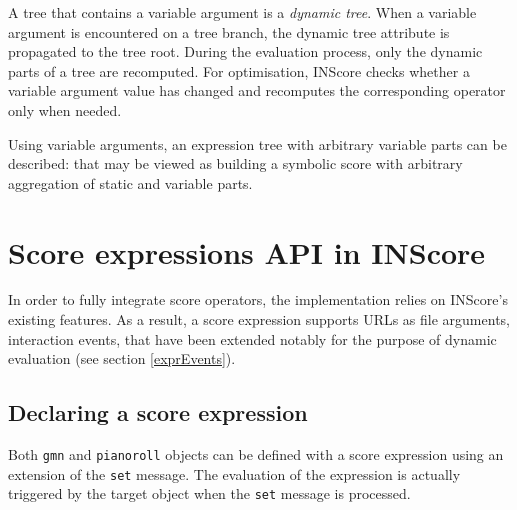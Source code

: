 \documentclass{article}
\newcommand{\OSC}[1]{{\fontsize{9.5pt}{10pt} \selectfont\texttt{#1}}}
\begin{document}
{A tree that contains a variable argument is a \emph{dynamic tree}. When a variable argument is encountered on a tree branch, the dynamic tree attribute is propagated to the tree root. During the evaluation process, only the dynamic parts of a tree are recomputed. For optimisation, INScore checks whether a variable argument value has changed and recomputes the corresponding operator only when needed.



Using variable arguments, an expression tree with arbitrary variable parts can be described: that may be viewed as building a symbolic score with arbitrary aggregation of static and variable parts.


\section{Score expressions API in INScore}
\label{exprAPI}
In order to fully integrate score operators, the implementation relies on INScore's existing features. As a result, a score expression supports URLs as file arguments, interaction events, that have been extended notably for the purpose of dynamic evaluation (see section \ref{exprEvents}).

\subsection{Declaring a score expression}
\label{declaringExpr}
Both \OSC{gmn} and \OSC{pianoroll} objects can be defined with a score expression using an extension of the \OSC{set} message. The evaluation of the expression is actually triggered by the target object when the \OSC{set} message is processed.

}
\end{document}
